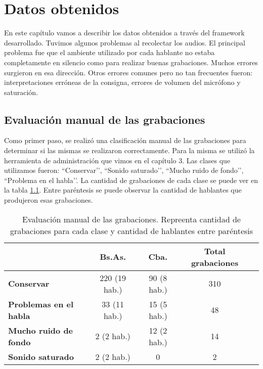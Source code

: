 \chapter{Datos obtenidos}

En este capítulo vamos a describir los datos obtenidos a través del framework desarrollado. Tuvimos algunos problemas al recolectar los audios. El principal problema fue que el ambiente utilizado por cada hablante no estaba completamente en silencio como para realizar buenas grabaciones. Muchos errores surgieron en esa dirección. Otros errores comunes pero no tan frecuentes fueron: interpretaciones erróneas de la consigna, errores de volumen del micrófono y saturación. 

\section{Evaluación manual de las grabaciones}

Como primer paso, se realizó una clasificación manual de las grabaciones para determinar si las mismas se realizaron correctamente. Para la misma se utilizó la herramienta de administración que vimos en el capítulo 3. Las clases que utilizamos fueron: ``Conservar’’, ``Sonido saturado’’, ``Mucho ruido de fondo’’, ``Problema en el habla’’. La cantidad de grabaciones de cada clase se puede ver en la tabla \ref{eva_table}. Entre paréntesis se puede observar la cantidad de hablantes que produjeron esas grabaciones.

\begin{table}[h]
\centering
\begin{tabular}{|l|c|c|c|c|}
\hline
\textbf{}  & \textbf{Bs.As. } & \textbf{Cba.} & \textbf{Total grabaciones} \\ \hline
\textbf{Conservar}  & 220 (19 hab.) & 90 (8 hab.) & 310 \\ \hline
\textbf{Problemas en el habla}  & 33 (11 hab.) & 15 (5 hab.) & 48 \\ \hline
\textbf{Mucho ruido de fondo}  & 2 (2 hab.) & 12 (2 hab.) & 14 \\ \hline
\textbf{Sonido saturado}  & 2 (2 hab.) & 0 & 2 \\ \hline
\end{tabular}
\caption{Evaluación manual de las grabaciones. Repreenta cantidad de grabaciones para cada clase y cantidad de hablantes entre paréntesis}
\label{eva_table}
\end{table}

